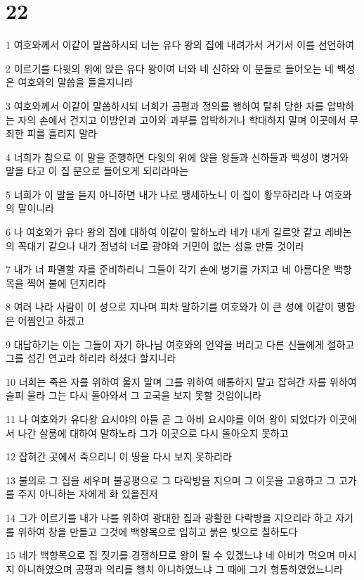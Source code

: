 \chapter{22}

\par 1 여호와께서 이같이 말씀하시되 너는 유다 왕의 집에 내려가서 거기서 이를 선언하여
\par 2 이르기를 다윗의 위에 앉은 유다 왕이여 너와 네 신하와 이 문들로 들어오는 네 백성은 여호와의 말씀을 들을지니라
\par 3 여호와께서 이같이 말씀하시되 너희가 공평과 정의를 행하여 탈취 당한 자를 압박하는 자의 손에서 건지고 이방인과 고아와 과부를 압박하거나 학대하지 말며 이곳에서 무죄한 피를 흘리지 말라
\par 4 너희가 참으로 이 말을 준행하면 다윗의 위에 앉을 왕들과 신하들과 백성이 병거와 말을 타고 이 집 문으로 들어오게 되리라마는
\par 5 너희가 이 말을 듣지 아니하면 내가 나로 맹세하노니 이 집이 황무하리라 나 여호와의 말이니라
\par 6 나 여호와가 유다 왕의 집에 대하여 이같이 말하노라 네가 내게 길르앗 같고 레바논의 꼭대기 같으나 내가 정녕히 너로 광야와 거민이 없는 성을 만들 것이라
\par 7 내가 너 파멸할 자를 준비하리니 그들이 각기 손에 병기를 가지고 네 아름다운 백향목을 찍어 불에 던지리라
\par 8 여러 나라 사람이 이 성으로 지나며 피차 말하기를 여호와가 이 큰 성에 이같이 행함은 어찜인고 하겠고
\par 9 대답하기는 이는 그들이 자기 하나님 여호와의 언약을 버리고 다른 신들에게 절하고 그를 섬긴 연고라 하리라 하셨다 할지니라
\par 10 너희는 죽은 자를 위하여 울지 말며 그를 위하여 애통하지 말고 잡혀간 자를 위하여 슬피 울라 그는 다시 돌아와서 그 고국을 보지 못할 것임이니라
\par 11 나 여호와가 유다왕 요시야의 아들 곧 그 아비 요시야를 이어 왕이 되었다가 이곳에서 나간 살룸에 대하여 말하노라 그가 이곳으로 다시 돌아오지 못하고
\par 12 잡혀간 곳에서 죽으리니 이 땅을 다시 보지 못하리라
\par 13 불의로 그 집을 세우며 불공평으로 그 다락방을 지으며 그 이웃을 고용하고 그 고가를 주지 아니하는 자에게 화 있을진저
\par 14 그가 이르기를 내가 나를 위하여 광대한 집과 광활한 다락방을 지으리라 하고 자기를 위하여 창을 만들고 그것에 백향목으로 입히고 붉은 빛으로 칠하도다
\par 15 네가 백향목으로 집 짓기를 경쟁하므로 왕이 될 수 있겠느냐 네 아비가 먹으며 마시지 아니하였으며 공평과 의리를 행치 아니하였느냐 그 때에 그가 형통하였었느니라
